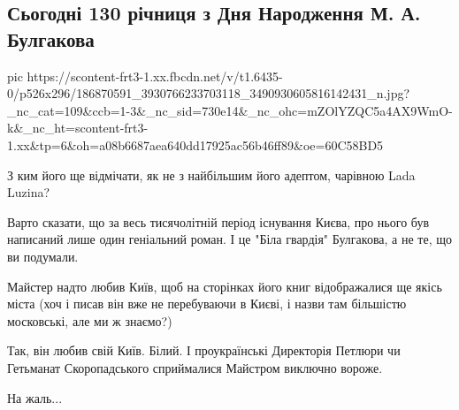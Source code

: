  
 
 
 
 

\subsection{Сьогодні 130 річниця з Дня Народження М. А. Булгакова}

\ifcmt
  pic https://scontent-frt3-1.xx.fbcdn.net/v/t1.6435-0/p526x296/186870591_3930766233703118_3490930605816142431_n.jpg?_nc_cat=109&ccb=1-3&_nc_sid=730e14&_nc_ohc=mZOlYZQC5a4AX9WmO-k&_nc_ht=scontent-frt3-1.xx&tp=6&oh=a08b6687aea640dd17925ac56b46ff89&oe=60C58BD5
\fi

З ким його ще відмічати, як не з найбільшим його адептом, чарівною Lada Luzina?

Варто сказати, що за весь тисячолітній період існування Києва, про нього був
написаний лише один геніальний роман. І це  "Біла гвардія" Булгакова, а не те,
що ви подумали.

Майстер надто любив Київ, щоб на сторінках його книг відображалися ще якісь
міста (хоч і писав він вже не перебуваючи в Києві, і назви там більшістю
московські, але ми ж знаємо?)

Так, він любив свій Київ. Білий. І проукраїнські Директорія Петлюри чи
Гетьманат Скоропадського сприймалися Майстром виключно вороже.

На жаль...
